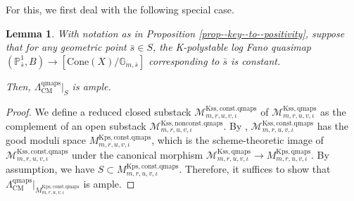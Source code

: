 \documentclass[12pt,twoside]{amsart}
\newtheorem{lem}[thm]{Lemma}
\theoremstyle{definition}
\begin{document}
For this, we first deal with the following special case.

\begin{lem}\label{lem--bigness-for-const-maps}
    With notation as in Proposition \ref{prop--key--to--positivity}, suppose that for any geometric point $\bar{s}\in S$, the K-polystable log Fano quasimap $(\mathbb{P}^1_{\bar{s}},B)\to [\mathrm{Cone}(X)/\mathbb{G}_{m,\bar{s}}]$ corresponding to $\bar{s}$ is constant.

    Then, $\Lambda^{\mathrm{qmaps}}_{\mathrm{CM}}|_S$ is ample.
\end{lem}

\begin{proof}
   We define a reduced closed substack $\mathcal{M}^{\mathrm{Kss,const.qmaps}}_{m,r,u,v,\iota}$ of $\mathcal{M}^{\mathrm{Kss,qmaps}}_{m,r,u,v,\iota}$ as the complement of an open substack $\mathcal{M}^{\mathrm{Kss,nonconst.qmaps}}_{m,r,u,v,\iota}$.
   By \cite[Lemma 4.14]{alper}, $\mathcal{M}^{\mathrm{Kss,const.qmaps}}_{m,r,u,v,\iota}$ has the good moduli space $M^{\mathrm{Kps,const.qmaps}}_{m,r,u,v,\iota}$, which is the scheme-theoretic image of $\mathcal{M}^{\mathrm{Kss,const.qmaps}}_{m,r,u,v,\iota}$ under the canonical morphism $\mathcal{M}^{\mathrm{Kss,qmaps}}_{m,r,u,v,\iota}\to M^{\mathrm{Kps,qmaps}}_{m,r,u,v,\iota}$.
   By assumption, we have $S\subset M^{\mathrm{Kps,const.qmaps}}_{m,r,u,v,\iota}$.
   Therefore, it suffices to show that $\Lambda^{\mathrm{qmaps}}_{\mathrm{CM}}|_{M^{\mathrm{Kps,const.qmaps}}_{m,r,u,v,\iota}}$ is ample. 


\end{proof}
\end{document}
